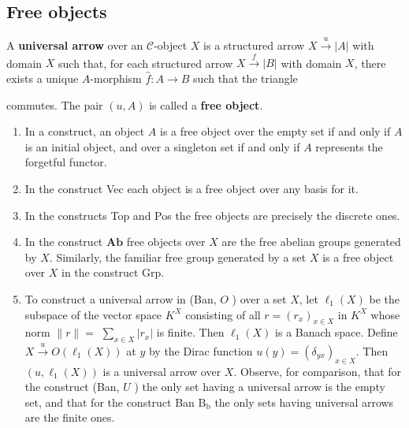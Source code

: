 \subsection*{Free objects}
A \textbf{universal arrow} over an $\mathcal{C}$-object $X$ is a structured arrow $X \xrightarrow{u}|A|$ with domain $X$ such that, for each structured arrow $X \xrightarrow{f}|B|$ with domain $X$, there exists a unique $A$-morphism $\hat{f}: A \rightarrow B$ such that the triangle 
 commutes. The pair $(u,A)$ is called a \textbf{free object}.

\begin{example}
\begin{enumerate}
    \item In a construct, an object $A$ is a free object over the empty set if and only if $A$ is an initial object, and over a singleton set if and only if $A$ represents the forgetful functor.
    \item In the construct Vec each object is a free object over any basis for it.
    \item In the constructs Top and Pos the free objects are precisely the discrete ones.
    \item In the construct $\mathbf{A b}$ free objects over $X$ are the free abelian groups generated by $X$.
    Similarly, the familiar free group generated by a set $X$ is a free object over $X$ in the construct Grp.
    \item To construct a universal arrow in (Ban, $O$ ) over a set $X$, let $\ell_1(X)$ be the subspace of the vector space $K^X$ consisting of all $r=\left(r_x\right)_{x \in X}$ in $K^X$ whose norm $\|r\|=$ $\sum_{x \in X}\left|r_x\right|$ is finite. Then $\ell_1(X)$ is a Banach space. Define $X \xrightarrow{u} O\left(\ell_1(X)\right)$ at $y$ by the Dirac function $u(y)=\left(\delta_{y x}\right)_{x \in X}$. Then $\left(u, \ell_1(X)\right)$ is a universal arrow over $X$. Observe, for comparison, that for the construct (Ban, $U$ ) the only set having a universal arrow is the empty set, and that for the construct Ban $\mathrm{B}_{\mathrm{b}}$ the only sets having universal arrows are the finite ones.
\end{enumerate}
\end{example}

